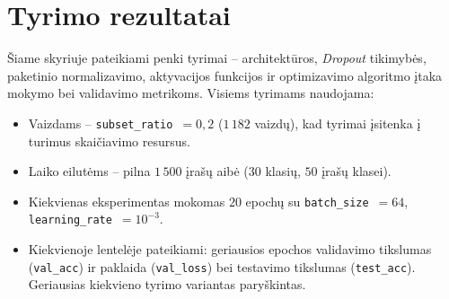 \section{Tyrimo rezultatai}
\label{sec:tyrimo_rezultatai}

Šiame skyriuje pateikiami penki tyrimai – architektūros, \textit{Dropout} tikimybės, paketinio normalizavimo, aktyvacijos funkcijos ir optimizavimo algoritmo įtaka mokymo bei validavimo metrikoms. Visiems tyrimams naudojama:
\begin{itemize}
    \item Vaizdams – \texttt{subset\_ratio}~$=0{,}2$ ($1\,182$ vaizdų), kad tyrimai įsitenka į turimus skaičiavimo resursus.
    \item Laiko eilutėms – pilna $1\,500$ įrašų aibė ($30$ klasių, $50$ įrašų klasei).
    \item Kiekvienas eksperimentas mokomas $20$ epochų su \texttt{batch\_size}~$=64$, \texttt{learning\_rate}~$=10^{-3}$.
    \item Kiekvienoje lentelėje pateikiami: geriausios epochos validavimo tikslumas (\texttt{val\_acc}) ir paklaida (\texttt{val\_loss}) bei testavimo tikslumas (\texttt{test\_acc}). Geriausias kiekvieno tyrimo variantas paryškintas.
\end{itemize}







